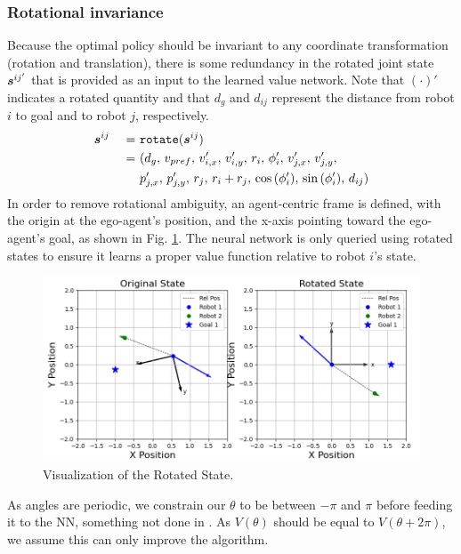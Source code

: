 \documentclass[conference]{IEEEtran}
\begin{document}
\subsubsection{Rotational invariance}
\noindent Because the optimal policy should be invariant to any coordinate transformation (rotation and translation), there is some redundancy in the rotated joint state $\boldsymbol{s}^{ij'}_{}$ that is provided as an input to the learned value network. Note that $(\cdot)'$ indicates a rotated quantity and that $d_g$ and $d_{ij}$ represent the distance from robot $i$ to goal and to robot $j$, respectively.
\begin{alignat}{3}
    &\boldsymbol{s}^{ij}_{} & \ = \ &\texttt{rotate}(\boldsymbol{s}^{ij}_{})\\
    && \ = \ & (d_{g}, \, v_{pref}, \, v_{i,x}', \, v_{i,y}', \, r_i, \, \phi_{i}', \, v_{j,x}', \, v_{j,y}', \nonumber \\
    && \ & p_{j,x}', \, p_{j,y}', \, r_j, \, r_i + r_j, \, \cos{(\phi_{i}')}, \, \sin{(\phi_{i}')}, \, d_{ij} ) \nonumber
\end{alignat}
In order to remove rotational ambiguity, an agent-centric frame is defined, with the origin at the ego-agent’s position, and the x-axis pointing toward the ego-agent’s goal, as shown in Fig. \ref{fig:rot_state}. The neural network is only queried using rotated states to ensure it learns a proper value function relative to robot $i$'s state.
\begin{figure}[h!]
    \centering
    \includegraphics[width=\linewidth]{docs/latex/figures/rotated_state.png}
    \caption{Visualization of the Rotated State.}
    \label{fig:rot_state}
\end{figure}

As angles are periodic, we constrain our $\theta$ to be between $-\pi$ and $\pi$ before feeding it to the NN, something not done in \cite{chen2017cadrl}. As $V(\theta)$ should be equal to $V(\theta+2\pi)$, we assume this can only improve the algorithm. 
\end{document}
